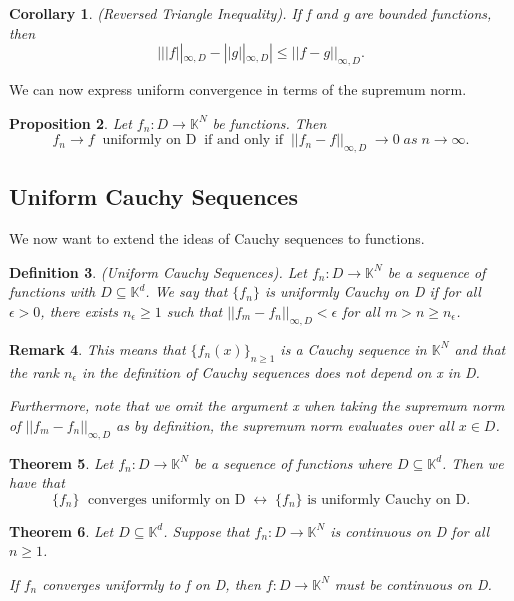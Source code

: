 \documentclass[twoside]{article}
\newcounter{lecnum}
\newcommand{\norm}[1]{\left\lVert#1\right\rVert}
\newtheorem{theorem}{Theorem}[lecnum]
\newtheorem{proposition}[theorem]{Proposition}
\newtheorem{remark}[theorem]{Remark}
\newtheorem{corollary}[theorem]{Corollary}
\newtheorem{definition}[theorem]{Definition}
\begin{document}

\begin{corollary}(Reversed Triangle Inequality). If f and g are bounded functions, then
$$
| ||f||_{\infty,D} - ||g||_{\infty,D} | \leq ||f - g||_{\infty,D}.
$$
\end{corollary}

We can now express uniform convergence in terms of the supremum norm.
\begin{proposition}Let $f_n: D \rightarrow \mathbb{K}^N$ be functions. Then
$$
f_n \rightarrow f \;\; \text{uniformly on D}\;\; \text{if and only if} \;\; ||f_n-f||_{\infty,D} \;\rightarrow 0 \; as \; n \rightarrow \infty.
$$
\end{proposition}
\subsection{Uniform Cauchy Sequences}
We now want to extend the ideas of Cauchy sequences to functions.

\begin{definition}(Uniform Cauchy Sequences). Let $f_n: D \rightarrow \mathbb{K}^N$ be a sequence of functions with $D \subseteq \mathbb{K}^d$. We say that $\{f_n\}$ is uniformly Cauchy on D if for all $\epsilon > 0$, there exists $n_{\epsilon} \geq 1$ such that $||f_m - f_n||_{\infty, D} < \epsilon$ for all $m > n \geq n_{\epsilon}$. 
\end{definition}

\begin{remark}This means that $\{f_n(x)\}_{n \geq 1}$ is a Cauchy sequence in $\mathbb{K}^N$ and that the rank $n_{\epsilon}$ in the definition of Cauchy sequences does not depend on x in D.

Furthermore, note that we omit the argument x when taking the supremum norm of $||f_m - f_n||_{\infty,D}$ as by definition, the supremum norm evaluates over all $x \in D$.
\end{remark}


\begin{theorem}
Let $f_n: D \rightarrow \mathbb{K}^N$ be a sequence of functions where $D \subseteq \mathbb{K}^d$. Then we have that
$$
\{f_n\} \; \text{ converges uniformly on D}\; \leftrightarrow \; \{f_n\} \text{ is uniformly Cauchy on D.}
$$
\end{theorem}

\begin{theorem}Let $D \subseteq \mathbb{K}^d$. Suppose that $f_n: D \rightarrow \mathbb{K}^N$ is continuous on D for all $n \geq 1$. 

If $f_n$ converges uniformly to f on D, then $f: D \rightarrow \mathbb{K}^N$ must be continuous on D.
\end{theorem}
\end{document}
